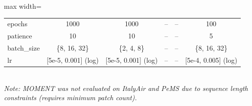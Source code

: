\begin{table}[H]
\begin{adjustbox}{max width=\textwidth}
\begin{small}
\begin{tabular}{l|ccccc}
epochs & 1000 & 1000 & -- & -- & 100 \\
patience & 10 & 10 & -- & -- & 5 \\
batch\_size & \{8, 16, 32\} & \{2, 4, 8\} & -- & -- & \{8, 16, 32\} \\
lr & [5e-5, 0.001] (log) & [5e-5, 0.001] (log) & -- & -- & [5e-4, 0.005] (log) \\
\bottomrule
\end{tabular}
\end{small}
\end{adjustbox}
\\[2pt]
\footnotesize{\textit{Note: MOMENT was not evaluated on ItalyAir and PeMS due to sequence length constraints (requires minimum patch count).}}
\end{table}